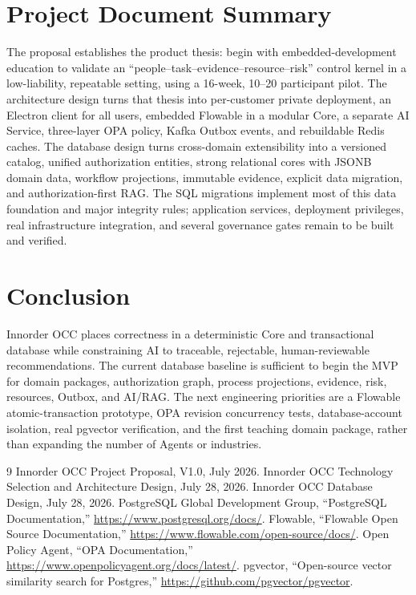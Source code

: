 \documentclass[journal,a4paper,onecolumn]{IEEEtran}
\begin{document}
\section{Project Document Summary}
The proposal establishes the product thesis: begin with embedded-development education to validate an ``people--task--evidence--resource--risk'' control kernel in a low-liability, repeatable setting, using a 16-week, 10--20 participant pilot. The architecture design turns that thesis into per-customer private deployment, an Electron client for all users, embedded Flowable in a modular Core, a separate AI Service, three-layer OPA policy, Kafka Outbox events, and rebuildable Redis caches. The database design turns cross-domain extensibility into a versioned catalog, unified authorization entities, strong relational cores with JSONB domain data, workflow projections, immutable evidence, explicit data migration, and authorization-first RAG. The SQL migrations implement most of this data foundation and major integrity rules; application services, deployment privileges, real infrastructure integration, and several governance gates remain to be built and verified.

\section{Conclusion}
Innorder OCC places correctness in a deterministic Core and transactional database while constraining AI to traceable, rejectable, human-reviewable recommendations. The current database baseline is sufficient to begin the MVP for domain packages, authorization graph, process projections, evidence, risk, resources, Outbox, and AI/RAG. The next engineering priorities are a Flowable atomic-transaction prototype, OPA revision concurrency tests, database-account isolation, real pgvector verification, and the first teaching domain package, rather than expanding the number of Agents or industries.

\begin{thebibliography}{9}
 Innorder OCC Project Proposal, V1.0, July 2026.
 Innorder OCC Technology Selection and Architecture Design, July 28, 2026.
 Innorder OCC Database Design, July 28, 2026.
 PostgreSQL Global Development Group, ``PostgreSQL Documentation,'' \url{https://www.postgresql.org/docs/}.
 Flowable, ``Flowable Open Source Documentation,'' \url{https://www.flowable.com/open-source/docs/}.
 Open Policy Agent, ``OPA Documentation,'' \url{https://www.openpolicyagent.org/docs/latest/}.
 pgvector, ``Open-source vector similarity search for Postgres,'' \url{https://github.com/pgvector/pgvector}.
\end{thebibliography}
\end{document}
